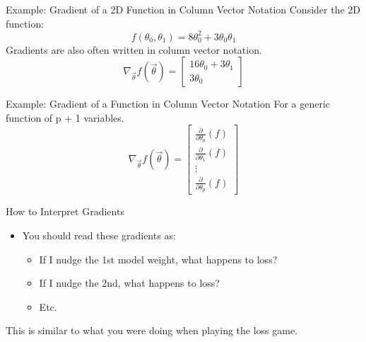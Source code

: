 \documentclass[aspectratio=169]{../latex_main/tntbeamer}  %
\begin{document}
	
	\begin{frame}[c]{Example: Gradient of a 2D Function in Column Vector Notation}
	    Consider the 2D function:
	    \begin{equation*}
	        f(\theta_0, \theta_1) = 8\theta^2_0 + 3\theta_0\theta_1
	    \end{equation*}
	    Gradients are also often written in column vector notation.
	    \begin{equation*}
	        \nabla_{\Vec{\theta}}f(\Vec{\theta}) = \left[\begin{array}{c}
	             16\theta_0 + 3\theta_1  \\
	             3\theta_0
	        \end{array}\right]
	    \end{equation*}
	\end{frame}
	
	
	\begin{frame}[c]{Example: Gradient of a Function in Column Vector Notation}
	    For a generic function of p + 1 variables.
	    \begin{equation*}
	        \nabla_{\Vec{\theta}}f(\Vec{\theta}) = \left[\begin{array}{c}
	             \frac{\partial}{\partial\theta_0}(f)  \\
	              \frac{\partial}{\partial\theta_1}(f) \\
	              \vdots\\
	               \frac{\partial}{\partial\theta_p}(f)
	        \end{array}\right]
	    \end{equation*}
	\end{frame}
	
	
	
	\begin{frame}[c]{How to Interpret Gradients}
	    \begin{itemize}
	        \item You should read these gradients as:
	        \begin{itemize}
	            \item If I nudge the 1st model weight, what happens to loss?
	            \item If I nudge the 2nd, what happens to loss?
	            \item Etc.
	        \end{itemize}
	    \end{itemize}
	    \bigskip
	    This is similar to what you were doing when playing the loss game.
	\end{frame}
	
\end{document}
